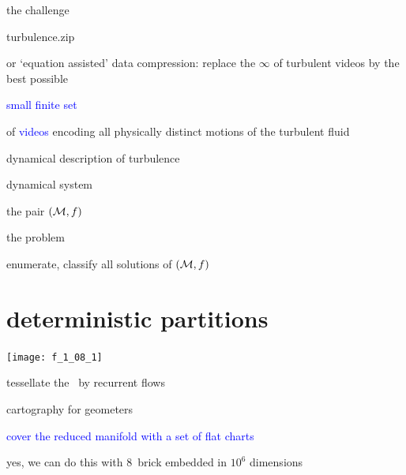 \begin{frame}{the challenge}
\bigskip

\begin{center}{\Large turbulence.zip}
\end{center}

\bigskip

    \begin{block}{or `equation assisted' data compression:}
replace the $\infty$ of
turbulent videos by the best possible
\begin{center}{\Large \textcolor{blue}{small finite set}}
\end{center}
of \textcolor{blue}{videos} encoding all physically distinct  motions of
the turbulent fluid
    \end{block}
\end{frame}

\begin{frame}{dynamical description of turbulence}

\begin{exampleblock}{dynamical system}
\begin{center}
the pair $(\mathcal{M},f)$
\end{center}
\end{exampleblock}

\bigskip

\begin{exampleblock}{the problem}
\begin{center}
enumerate, classify all solutions of $(\mathcal{M},f)$
\end{center}
\end{exampleblock}

\end{frame}

\section[deterministic partitions]
{deterministic partitions}

\begin{frame}{}
\begin{center}
\texttt{[image: f\_1\_08\_1]}
\end{center}
 tessellate the \statesp\ by {\Large recurrent flows}
\end{frame}

\begin{frame}{cartography for geometers}
\bigskip

\textcolor{blue}{cover the reduced manifold with a set of flat charts}

\hfill
\vfill
yes, we can do this with 8\dmn\ brick embedded in $10^6$ dimensions
\end{frame}

